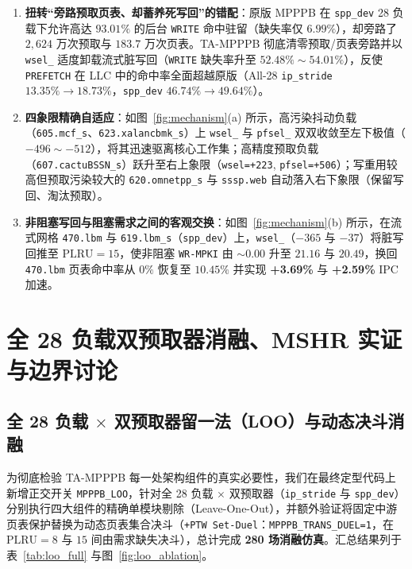 \documentclass[10.5pt,compsoc,UTF8]{CjC}
\begin{document}
\begin{enumerate}
  \item \textbf{扭转“旁路预取页表、却蓄养死写回”的错配}：原版 MPPPB 在 \texttt{spp\_dev} 28 负载下允许高达 $93.01\%$ 的后台 \texttt{WRITE} 命中驻留（缺失率仅 $6.99\%$），却旁路了 $2{,}624$ 万次预取与 $183.7$ 万次页表。TA-MPPPB 彻底清零预取/页表旁路并以 \texttt{wsel\_} 适度卸载流式脏写回（\texttt{WRITE} 缺失率升至 $52.48\%\sim 54.01\%$），反使 \texttt{PREFETCH} 在 LLC 中的命中率全面超越原版（All-28 \texttt{ip\_stride} $13.35\%\to 18.73\%$，\texttt{spp\_dev} $46.74\%\to 49.64\%$）。
  \item \textbf{四象限精确自适应}：如图~\ref{fig:mechanism}(a) 所示，高污染抖动负载（\texttt{605.mcf\_s}、\texttt{623.xalancbmk\_s}）上 \texttt{wsel\_} 与 \texttt{pfsel\_} 双双收敛至左下极值（$-496\sim -512$），将其迅速驱离核心工作集；高精度预取负载（\texttt{607.cactuBSSN\_s}）跃升至右上象限（\texttt{wsel=+223}, \texttt{pfsel=+506}）；写重用较高但预取污染较大的 \texttt{620.omnetpp\_s} 与 \texttt{sssp.web} 自动落入右下象限（保留写回、淘汰预取）。
  \item \textbf{非阻塞写回与阻塞需求之间的客观交换}：如图~\ref{fig:mechanism}(b) 所示，在流式网格 \texttt{470.lbm} 与 \texttt{619.lbm\_s}（\texttt{spp\_dev}）上，\texttt{wsel\_}（$-365$ 与 $-37$）将脏写回推至 $\mathrm{PLRU}=15$，使非阻塞 \texttt{WR-MPKI} 由 $\sim 0.00$ 升至 $21.16$ 与 $20.49$，换回 \texttt{470.lbm} 页表命中率从 $0\%$ 恢复至 $10.45\%$ 并实现 \textbf{+3.69\%} 与 \textbf{+2.59\%} IPC 加速。
\end{enumerate}

\section{全 28 负载双预取器消融、MSHR 实证与边界讨论}

\subsection{全 28 负载 $\times$ 双预取器留一法（LOO）与动态决斗消融}

为彻底检验 TA-MPPPB 每一处架构组件的真实必要性，我们在最终定型代码上新增正交开关 \texttt{MPPPB\_LOO}，针对全 28 负载 $\times$ 双预取器（\texttt{ip\_stride} 与 \texttt{spp\_dev}）分别执行四大组件的精确单模块剔除（Leave-One-Out），并额外验证将固定中游页表保护替换为动态页表集合决斗（\texttt{+PTW Set-Duel}：\texttt{MPPPB\_TRANS\_DUEL=1}，在 $\mathrm{PLRU}=8$ 与 $15$ 间由需求缺失决斗），总计完成 \textbf{280 场消融仿真}。汇总结果列于表~\ref{tab:loo_full} 与图~\ref{fig:loo_ablation}。
\end{document}
